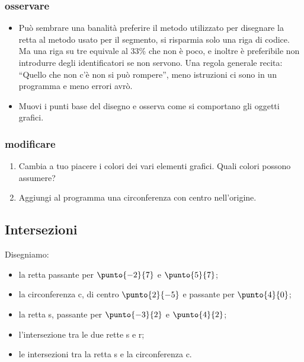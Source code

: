 \subsubsection{osservare}

\begin{itemize}
\item Può sembrare una banalità preferire il metodo utilizzato per 
disegnare la retta al metodo usato per il segmento, si risparmia solo una 
riga di codice. 
Ma una riga su tre equivale al 33\% che non è poco, e inoltre è 
preferibile non introdurre degli identificatori se non servono. Una regola 
generale recita: ``Quello che non c'è non si può rompere'', meno istruzioni 
ci sono in un programma e meno errori avrò.

\item Muovi i punti base del disegno e osserva come si comportano gli oggetti 
grafici.
\end{itemize}

\subsubsection{modificare}

\begin{enumerate} [noitemsep]
\item Cambia a tuo piacere i colori dei vari elementi grafici. Quali colori 
possono assumere?
\item Aggiungi al programma una circonferenza con centro nell'origine.
\end{enumerate}

\subsection{Intersezioni}
\label{subsec:geo_int_intersezioni}

Disegniamo:
\begin{itemize} [nosep]
\item la retta passante per \(\punto{-2}{7}\) e \(\punto{5}{7}\); 
\item la circonferenza c, di centro \(\punto{2}{-5}\) e 
passante per \(\punto{4}{0}\);
\item la retta s, passante per \(\punto{-3}{2}\) e \(\punto{4}{2}\);
\item l'intersezione tra le due rette s e r;
\item le intersezioni tra la retta s e la circonferenza c. 
\end{itemize}

